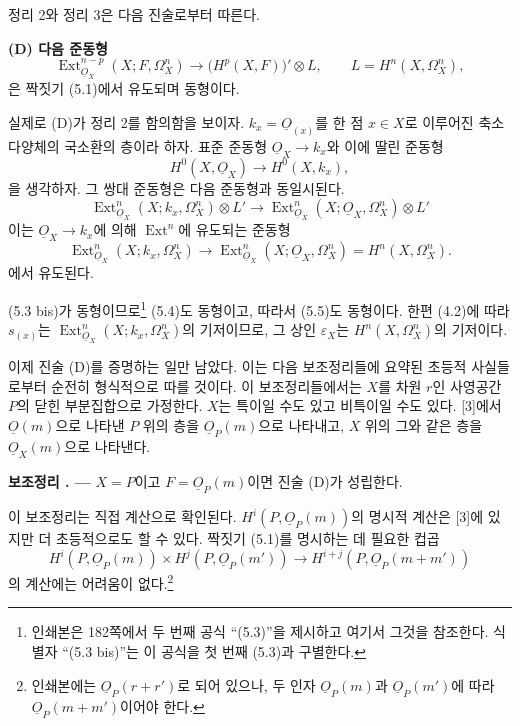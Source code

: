 \documentclass[11pt,twoside,openany]{book}
\numberwithin{equation}{section}
\newcommand{\sourceunit}{front}
\newcommand{\src}[1]{%
  \phantomsection\hypertarget{src:\sourceunit:#1}{}%
  \marginpar{\raggedleft\footnotesize\sffamily #1}%
}
\newcommand{\Osh}{\underline{O}}
\theoremstyle{plain}
\theoremstyle{definition}
\theoremstyle{remark}
\newcommand{\result}[2]{%
  \par\medskip\noindent\textbf{#1%
  \if\relax\detokenize{#2}\relax\else\space#2\fi. ---}\enspace
}
\begin{document}
정리 2와 정리 3은 다음 진술로부터 따른다.

\noindent\textbf{(D) 다음 준동형}
\begin{equation}\tag{5.2 bis}
  \operatorname{Ext}_{\Osh_X}^{n-p}(X;F,\Omega_X^{n})
  \longrightarrow\bigl(H^{p}(X,F)\bigr)'\otimes L,
  \qquad L=H^{n}(X,\Omega_X^{n}),
\end{equation}
은 짝짓기 (5.1)에서 유도되며 동형이다.

실제로 (D)가 정리 2를 함의함을 보이자. $k_x=\Osh_{(x)}$를 한 점
$x\in X$로 이루어진 축소 다양체의 국소환의 층이라 하자. 표준 준동형
$\Osh_X\longrightarrow k_x$와 이에 딸린 준동형
\begin{equation}\tag{5.3 bis}
  H^{0}(X,\Osh_X)\longrightarrow H^{0}(X,k_x),
\end{equation}
을 생각하자. 그 쌍대 준동형은 다음 준동형과 동일시된다.
\begin{equation}\tag{5.4}
  \operatorname{Ext}_{\Osh_X}^{n}(X;k_x,\Omega_X^{n})\otimes L'
  \longrightarrow
  \operatorname{Ext}_{\Osh_X}^{n}(X;\Osh_X,\Omega_X^{n})\otimes L'
\end{equation}
이는 $\Osh_X\longrightarrow k_x$에 의해 $\operatorname{Ext}^{n}$에
유도되는 준동형
\begin{equation}\tag{5.5}
  \operatorname{Ext}_{\Osh_X}^{n}(X;k_x,\Omega_X^{n})
  \longrightarrow
  \operatorname{Ext}_{\Osh_X}^{n}(X;\Osh_X,\Omega_X^{n})
  =H^{n}(X,\Omega_X^{n}).
\end{equation}
에서 유도된다.

\src{183}
(5.3 bis)가 동형이므로\footnote{인쇄본은 182쪽에서 두 번째 공식
“(5.3)”을 제시하고 여기서 그것을 참조한다. 식별자 “(5.3 bis)”는 이
공식을 첫 번째 (5.3)과 구별한다.} (5.4)도 동형이고, 따라서 (5.5)도
동형이다. 한편 (4.2)에 따라 $s_{(x)}$는
$\operatorname{Ext}_{\Osh_X}^{n}(X;k_x,\Omega_X^{n})$의 기저이므로, 그
상인 $\varepsilon_X$는 $H^{n}(X,\Omega_X^{n})$의 기저이다.

이제 진술 (D)를 증명하는 일만 남았다. 이는 다음 보조정리들에 요약된
초등적 사실들로부터 순전히 형식적으로 따를 것이다. 이 보조정리들에서는
$X$를 차원 $r$인 사영공간 $P$의 닫힌 부분집합으로 가정한다. $X$는
특이일 수도 있고 비특이일 수도 있다. [3]에서 $\Osh(m)$으로 나타낸 $P$
위의 층을 $\Osh_P(m)$으로 나타내고, $X$ 위의 그와 같은 층을
$\Osh_X(m)$으로 나타낸다.

\result{보조정리}{2} $X=P$이고 $F=\Osh_P(m)$이면 진술 (D)가 성립한다.

이 보조정리는 직접 계산으로 확인된다. $H^{i}(P,\Osh_P(m))$의 명시적
계산은 [3]에 있지만 더 초등적으로도 할 수 있다. 짝짓기 (5.1)를
명시하는 데 필요한 컵곱
\[
  H^{i}(P,\Osh_P(m))\times H^{j}(P,\Osh_P(m'))
  \longrightarrow H^{i+j}(P,\Osh_P(m+m'))
\]
의 계산에는 어려움이 없다.\footnote{인쇄본에는 $\Osh_P(r+r')$로 되어
있으나, 두 인자 $\Osh_P(m)$과 $\Osh_P(m')$에 따라
$\Osh_P(m+m')$이어야 한다.}
\end{document}
